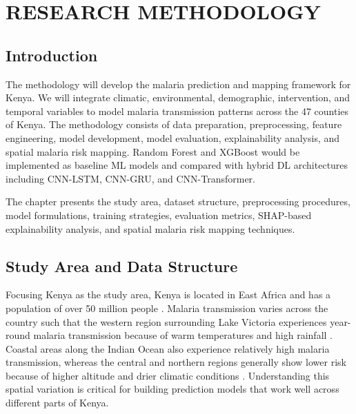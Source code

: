 \chapter{RESEARCH METHODOLOGY}
	
	\section{Introduction}
	
	The methodology will  develop the malaria prediction and mapping framework for Kenya. We will  integrate climatic, environmental, demographic, intervention, and temporal variables to model malaria transmission patterns across the 47 counties of Kenya. The methodology consists of data preparation, preprocessing, feature engineering, model development, model evaluation, explainability analysis, and spatial malaria risk mapping. Random Forest and XGBoost would  be implemented as baseline ML models and compared with hybrid DL architectures including CNN-LSTM, CNN-GRU, and CNN-Transformer.
	
	The chapter presents the study area, dataset structure, preprocessing procedures, model formulations, training strategies, evaluation metrics, SHAP-based explainability analysis, and spatial malaria risk mapping techniques.

	\section{Study Area and Data Structure}
	\label{sec:study_area}
	Focusing  Kenya as the study area, Kenya  is located in East Africa and has a population of over 50 million people \cite{WHO_malaria_2024}. Malaria transmission varies  across the country such that  the western region surrounding Lake Victoria experiences year-round malaria transmission because of warm temperatures and high rainfall \cite{amek2012spatial}. Coastal areas along the Indian Ocean also experience relatively high malaria transmission, whereas the central and northern regions generally show lower risk because of higher altitude and drier climatic conditions \cite{Snow2015}. Understanding this spatial variation  is critical for building prediction models that work well across different parts of Kenya.
	
